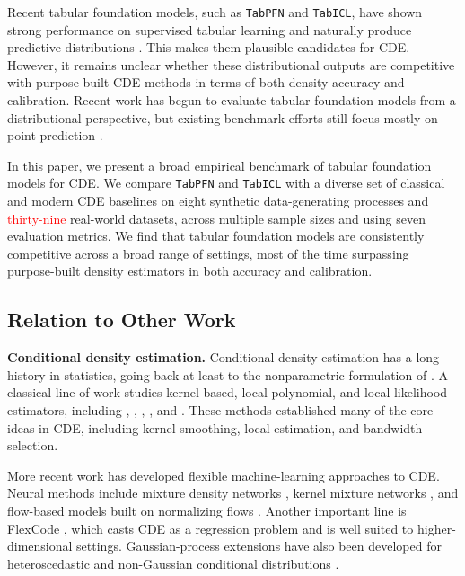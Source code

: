 \documentclass{article}
\newcommand{\method}[1]{\texttt{#1}}
\begin{document}
Recent tabular foundation models, such as \method{TabPFN} and \method{TabICL},
have shown strong performance on supervised tabular learning and naturally
produce predictive distributions
\citep{hollmann2025tabpfn,qu2025tabicl,mcelfresh2024neural}.
This makes them plausible candidates for CDE. However, it remains unclear
whether these distributional outputs are competitive with purpose-built CDE
methods in terms of both density accuracy and calibration. Recent work has begun
to evaluate tabular foundation models from a distributional perspective, but
existing benchmark efforts still focus mostly on point prediction
\citep{erickson2025tabarena,landsgesell2026distributional}.

In this paper, we present a broad empirical benchmark of tabular foundation
models for CDE. We compare \method{TabPFN} and \method{TabICL} with a diverse
set of classical and modern CDE baselines on eight synthetic data-generating
processes and \textcolor{red}{thirty-nine} real-world datasets, across multiple sample sizes and
using seven evaluation metrics. We find that tabular foundation models are
consistently competitive across a broad range of settings, most of the time surpassing purpose-built density estimators in both accuracy and
calibration.



\subsection{Relation to Other Work}
\label{sec:related}

\textbf{Conditional density estimation.}
Conditional density estimation has a long history in statistics, going back at least to the nonparametric formulation of \citet{rosenblatt1969conditional}. A classical line of work studies kernel-based, local-polynomial, and local-likelihood estimators, including \citet{hyndman1996estimating}, \citet{fan1996estimation}, \citet{bashtannyk2001bandwidth}, \citet{hyndman2002nonparametric}, and \citet{efromovich2007conditional}. These methods established many of the core ideas in CDE, including kernel smoothing, local estimation, and bandwidth selection.

More recent work has developed flexible machine-learning approaches to CDE. Neural methods include mixture density networks \citep{bishop1994mixture}, kernel mixture networks \citep{ambrogioni2017kmn}, and flow-based models built on normalizing flows \citep{dinh2014nice,dinh2017realnvp,papamakarios2017maf,huang2018naf,durkan2019nsf,papamakarios2021normalizing}. Another important line is FlexCode \citep{izbicki2017converting}, which casts CDE as a regression problem and is well suited to higher-dimensional settings. Gaussian-process extensions have also been developed for heteroscedastic and non-Gaussian conditional distributions \citep{le2005heteroscedastic,platanios2013mgpch,dutordoir2018gpcde}.
\end{document}
